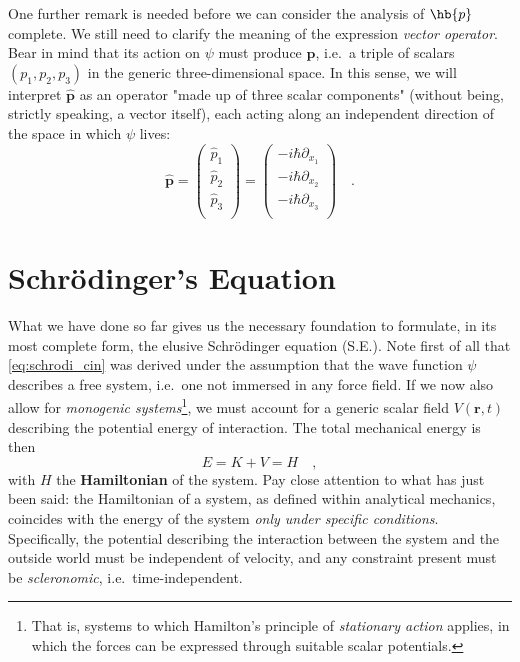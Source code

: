 One further remark is needed before we can consider the analysis of $\hb{p}$ complete. We still need to clarify the meaning of the expression \emph{vector operator}. Bear in mind that its action on $\psi$ must produce $\bm{p}$, i.e.\ a triple of scalars $(p_1, p_2, p_3)$ in the generic three-dimensional space. In this sense, we will interpret $\hat{\bm{p}}$ as an operator "made up of three scalar components" (without being, strictly speaking, a vector itself), each acting along an independent direction of the space in which $\psi$ lives:
\begin{equation}
    \hat{\bm{p}} = 
    \begin{pmatrix}
        \hat{p}_1 \\
        \hat{p}_2 \\
        \hat{p}_3 \\
    \end{pmatrix}
    = 
    \begin{pmatrix}
        -i\hbar \partial_{x_1} \\
        -i\hbar \partial_{x_2} \\
        -i\hbar \partial_{x_3} \\
    \end{pmatrix}
    \quad.
    \label{eq:op_p}
\end{equation}   

\section{Schrödinger's Equation}
What we have done so far gives us the necessary foundation to formulate, in its most complete form, the elusive Schrödinger equation (S.E.). Note first of all that \eqref{eq:schrodi_cin} was derived under the assumption that the wave function $\psi$ describes a free system, i.e.\ one not immersed in any force field. If we now also allow for \emph{monogenic systems}\footnote{That is, systems to which Hamilton's principle of \emph{stationary action} applies, in which the forces can be expressed through suitable scalar potentials.}, we must account for a generic scalar field $V(\bm{r},t)$ describing the potential energy of interaction. The total mechanical energy is then
\[
    E = K + V = H \quad,
\]
with $H$ the \textbf{Hamiltonian} of the system. Pay close attention to what has just been said: the Hamiltonian of a system, as defined within analytical mechanics, coincides with the energy of the system \emph{only under specific conditions}. Specifically, the potential describing the interaction between the system and the outside world must be independent of velocity, and any constraint present must be \emph{scleronomic}, i.e.\ time-independent.

